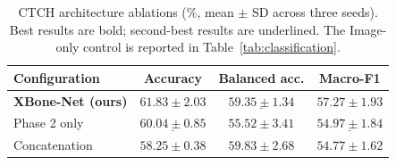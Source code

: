 \begin{table}[t]
\caption{CTCH architecture ablations (\%, mean $\pm$ SD across three seeds). Best results are bold; second-best results are underlined. The Image-only control is reported in Table~\ref{tab:classification}.}
\label{tab:ablation}
\centering\footnotesize
\setlength{\tabcolsep}{3.5pt}
\begin{tabular}{@{}lccc@{}}
\toprule
Configuration & Accuracy & Balanced acc. & Macro-F1 \\
\midrule
\textbf{XBone-Net (ours)} & $\mathbf{61.83\pm2.03}$ & $\underline{59.35\pm1.34}$ & $\mathbf{57.27\pm1.93}$ \\
Phase 2 only & $\underline{60.04\pm0.85}$ & $55.52\pm3.41$ & $\underline{54.97\pm1.84}$ \\
Concatenation & $58.25\pm0.38$ & $\mathbf{59.83\pm2.68}$ & $54.77\pm1.62$ \\
\bottomrule
\end{tabular}
\end{table}
